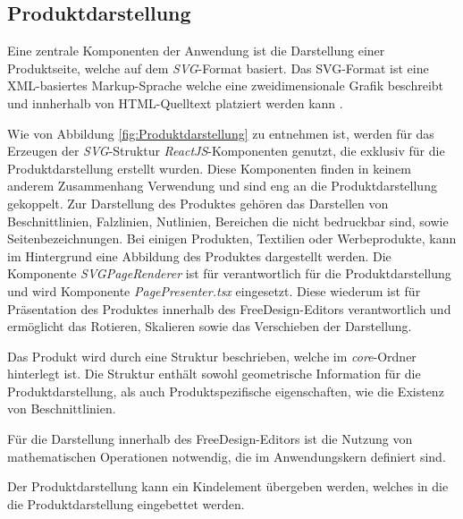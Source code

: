 \subsection{Produktdarstellung}
Eine zentrale Komponenten der Anwendung ist die Darstellung einer Produktseite, welche auf dem \emph{SVG}-Format basiert.
Das SVG-Format ist eine XML-basiertes Markup-Sprache welche eine zweidimensionale Grafik beschreibt und innherhalb von HTML-Quelltext platziert werden kann \autocite[vgl.][]{AboutSVG}. 

Wie von Abbildung \ref{fig:Produktdarstellung} zu entnehmen ist, werden für das Erzeugen der \emph{SVG}-Struktur \emph{ReactJS}-Komponenten genutzt, die exklusiv für die Produktdarstellung erstellt wurden. Diese Komponenten finden in keinem anderem Zusammenhang Verwendung und sind eng an die Produktdarstellung gekoppelt. 
Zur Darstellung des Produktes gehören das Darstellen von Beschnittlinien, Falzlinien, Nutlinien, Bereichen die nicht bedruckbar sind, sowie Seitenbezeichnungen. Bei einigen Produkten, Textilien oder Werbeprodukte, kann im Hintergrund eine Abbildung des Produktes dargestellt werden. Die Komponente \emph{SVGPageRenderer} ist für verantwortlich für die Produktdarstellung und wird Komponente \emph{PagePresenter.tsx} eingesetzt. Diese wiederum ist für Präsentation des Produktes innerhalb des FreeDesign-Editors verantwortlich und ermöglicht das Rotieren, Skalieren sowie das Verschieben der Darstellung. 


Das Produkt wird durch eine Struktur beschrieben, welche im \emph{core}-Ordner hinterlegt ist. Die Struktur enthält sowohl geometrische Information für die Produktdarstellung, als auch Produktspezifische eigenschaften, wie die Existenz von Beschnittlinien. 

Für die Darstellung innerhalb des FreeDesign-Editors ist die Nutzung von mathematischen Operationen notwendig, die im Anwendungskern definiert sind. 

Der Produktdarstellung kann ein Kindelement übergeben werden, welches in die die Produktdarstellung eingebettet werden. 



